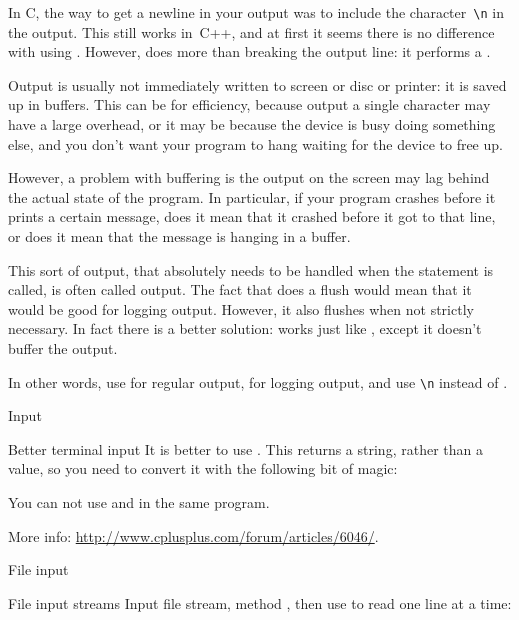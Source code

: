 In C, the way to get a newline in your output was to include the
character~\verb+\n+ in the output. This still works in~C++, and at
first it seems there is no difference with using . However,
 does more than breaking the output line: it
performs a .

Output is usually not immediately written to screen or disc or
printer: it is saved up in buffers. This can be for efficiency,
because output a single character may have a large overhead, or it may
be because the device is busy doing something else, and you don't want
your program to hang waiting for the device to free up.

However, a problem with buffering is the output on the screen may lag
behind the actual state of the program. In particular, if your program
crashes before it prints a certain message, does it mean that it
crashed before it got to that line, or does it mean that the message
is hanging in a buffer.

This sort of output, that absolutely needs to be handled when the
statement is called, is often called  output.
The fact that  does a flush would mean that it would be good
for logging output. However, it also flushes when not strictly
necessary. In fact there is a better solution:
 works just like , except it
doesn't buffer the output.

In other words, use  for regular output,  for logging
output, and use \verb+\n+ instead of .

 {Input}

\begin{block}{Better terminal input}
  \label{sl:getline}
  It is better to use . This returns a string,
  rather than a value, so you need to convert it with the following bit
  of magic:

  You can not use  and  in the same program.

  More info:
  \url{http://www.cplusplus.com/forum/articles/6046/}.

\end{block}

 {File input}

\begin{block}{File input streams}
  \label{sl:filein}
  Input file stream, method , then use
   to read one line at a time:
\end{block}

